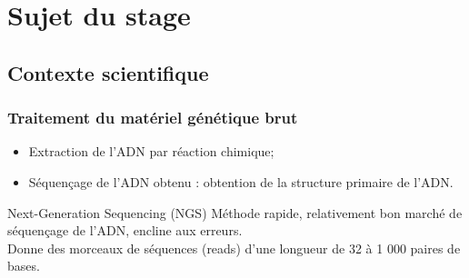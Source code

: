 \documentclass{beamer}
\begin{document}
\section{Sujet du stage}




\begin{frame}
\tableofcontents[currentsection]
\end{frame}

\subsection{Contexte scientifique}

\begin{frame}
\tableofcontents[currentsubsection]
\end{frame}

\begin{frame}
\frametitle{Traitement du matériel génétique brut}

\begin{itemize}
\item Extraction de l'ADN par réaction chimique;
\pause
\item Séquençage de l'ADN obtenu : obtention de la \alert{structure primaire} de l'ADN.
\end{itemize}
\pause

\begin{block}{Next-Generation Sequencing (NGS)}
Méthode rapide, relativement bon marché de séquençage de l'ADN, encline aux erreurs. \\
Donne des morceaux de séquences (\alert{reads}) d'une longueur de 32 à 1 000 paires de bases.
\end{block}

\end{frame}
\end{document}
